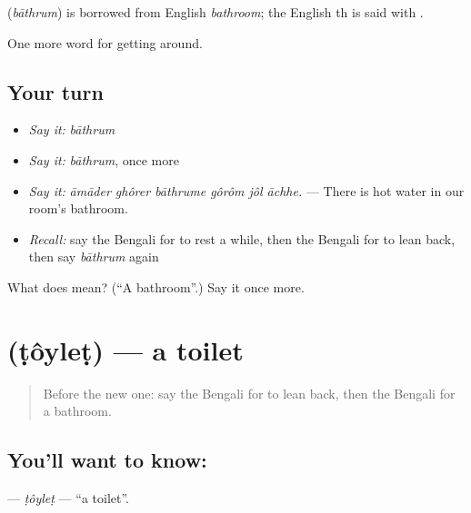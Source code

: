 \begin{cousinweb}
\textbf{} (\emph{bāthrum}) is borrowed from English \emph{bathroom}; the English th is said with .
\end{cousinweb}

\begin{grammarlens}[title={What you've built}]
One more word for getting around.
\end{grammarlens}

\subsection*{Your turn}
\begin{itemize}
\raggedright
  \item \emph{Say it:} \emph{bāthrum}
  \item \emph{Say it:} \emph{bāthrum}, once more
  \item \emph{Say it:} \emph{āmāder ghôrer bāthrume gôrôm jôl āchhe.} — There is hot water in our room's bathroom.
  \item \emph{Recall:} say the Bengali for to rest a while, then the Bengali for to lean back, then say \emph{bāthrum} again
\end{itemize}

\begin{tcolorbox}[breakable,colback=teal!4,colframe=teal!35!black,title={Before you move on}]
What does  mean? (\textquotedblleft{}A bathroom\textquotedblright{}.) Say it once more.
\end{tcolorbox}
\section[\texorpdfstring{\bn{টয়লেট} (ṭôyleṭ)}{টয়লেট (ṭôyleṭ)}]{ (ṭôyleṭ) — a toilet}

\label{lesson:BN-C405-toylet}



\begin{quote}
Before the new one: say the Bengali for to lean back, then the Bengali for a bathroom.
\end{quote}

\subsection*{You'll want to know: }
\textbf{} — \emph{ṭôyleṭ} — \textquotedblleft{}a toilet\textquotedblright{}.

\begin{quote}
   
\end{quote}

